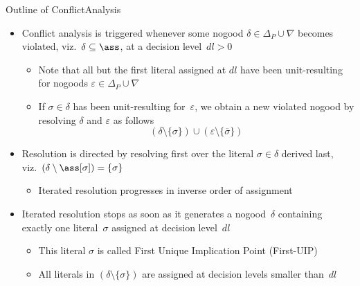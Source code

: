 \begin{frame}{Outline of {ConflictAnalysis}}
\begin{itemize}
\item Conflict analysis is triggered whenever
      some nogood $\delta\in\Delta_P\cup\nabla$
      becomes violated, viz.\ $\delta\subseteq\ass$,
      at a decision level~$\mathit{dl}>0$
      \begin{itemize}
      \item Note that all but the first literal assigned at $\mathit{dl}$
        have been unit-resulting for nogoods
        $\varepsilon\in\Delta_P\cup\nabla$
      \item If $\sigma\in\delta$ has been unit-resulting for~$\varepsilon$,
        we obtain a new violated nogood
        by resolving $\delta$ and $\varepsilon$ as follows
        \[
        (\delta\setminus\{\sigma\})\cup(\varepsilon\setminus\{\overline{\sigma}\})
        \]
      \end{itemize}
\pause
\item Resolution is directed by resolving first over the literal $\sigma\in\delta$
      derived last, viz.\ $(\delta\setminus\ass[\sigma])=\{\sigma\}$
      \begin{itemize}
      \item Iterated resolution progresses in inverse
                     order of assignment
      \end{itemize}
\pause
\item Iterated resolution stops as soon as it generates
      a nogood~$\delta$ containing exactly one literal~$\sigma$ assigned
      at decision level~$\mathit{dl}$
  \begin{itemize}
  \item This literal $\sigma$ is called \alert{First Unique Implication Point} (First-UIP)
  \item All literals in $(\delta\setminus\{\sigma\})$ are assigned
        at decision levels smaller than~$\mathit{dl}$
  \end{itemize}
\end{itemize}
\end{frame}
\begin{frame}[c]

\end{frame}
